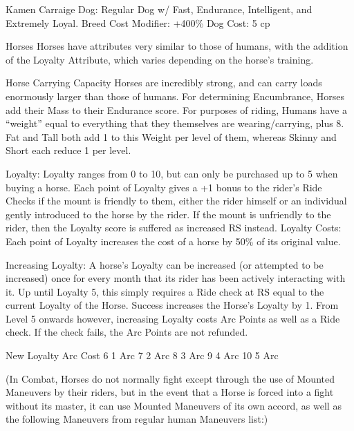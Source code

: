 \documentclass[oneside,11pt,english]{book}
\begin{document}
Kamen Carraige Dog: Regular Dog w/ Fast, Endurance, Intelligent, and Extremely Loyal. 
Breed Cost Modifier: +400\% 
Dog Cost: 5 cp 

 

 

 

Horses 
Horses have attributes very similar to those of humans, with the addition of the Loyalty Attribute, which 
varies depending on the horse’s training. 

 

Horse Carrying Capacity 
Horses are incredibly strong, and can carry loads enormously larger than those of humans. For 
determining Encumbrance, Horses add their Mass to their Endurance score. 
For purposes of riding, Humans have a “weight” equal to everything that they themselves are 
wearing/carrying, plus 8. Fat and Tall both add 1 to this Weight per level of them, whereas Skinny and 
Short each reduce 1 per level. 

 

Loyalty: Loyalty ranges from 0 to 10, but can only be purchased up to 5 when buying a horse. Each point 
of Loyalty gives a +1 bonus to the rider’s Ride Checks if the mount is friendly to them, either the rider 
himself or an individual gently introduced to the horse by the rider. If the mount is unfriendly to the rider, 
then the Loyalty score is suffered as increased RS instead. 
Loyalty Costs: Each point of Loyalty increases the cost of a horse by 50\% of its original value. 

 

Increasing Loyalty: A horse’s Loyalty can be increased (or attempted to be increased) once for every 
month that its rider has been actively interacting with it. Up until Loyalty 5, this simply requires a Ride 
check at RS equal to the current Loyalty of the Horse. Success increases the Horse’s Loyalty by 1. 
From Level 5 onwards however, increasing Loyalty costs Arc Points as well as a Ride check. If the check 
fails, the Arc Points are not refunded. 

 

 

New Loyalty Arc Cost 
6 1 Arc 
7 2 Arc 
8 3 Arc 
9 4 Arc 
10 5 Arc 

 
(In Combat, Horses do not normally fight except through the use of Mounted Maneuvers by their riders, 
but in the event that a Horse is forced into a fight without its master, it can use Mounted Maneuvers of its 
own accord, as well as the following Maneuvers from regular human Maneuvers list:) 
\end{document}
